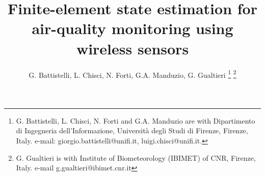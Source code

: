 \documentclass[journal]{IEEEtran}
\begin{document}
%
\title{Finite-element state estimation for air-quality monitoring using wireless sensors}
%
%
%

\author{G. Battistelli, L. Chisci, N. Forti, G.A. Manduzio, G. Gualtieri%
\thanks{G. Battistelli, L. Chisci, N. Forti and G.A. Manduzio are with Dipartimento di Ingegneria dell'Informazione, Universit\`a degli Studi di Firenze, Firenze, Italy.
e-mail: giorgio.battistelli@unifi.it, luigi.chisci@unifi.it.}%
\thanks{G. Gualtieri is with Institute of Biometeorology (IBIMET) of CNR, Firenze, Italy. e-mail g.gualtieri@ibimet.cnr.it}}%

% 
%
\end{document}
